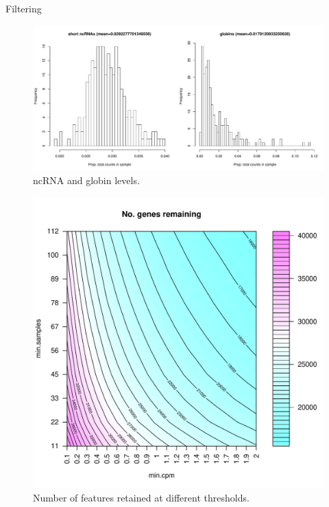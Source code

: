 Filtering
\begin{figure}
    \includegraphics[width=1.0\textwidth, page=1]{./mainmatter/figures/chapter_02/rnaseq_data_setup.per_sample.short_ncRNA_globin_levels_hist.pdf}
    \caption{ncRNA and globin levels.}
\end{figure}

\begin{figure}
    \includegraphics[width=1.0\textwidth]{./mainmatter/figures/chapter_02/rnaseq_data_setup.filtering_thresh_contour.pdf}
    \caption{Number of features retained at different thresholds.}
\end{figure}

